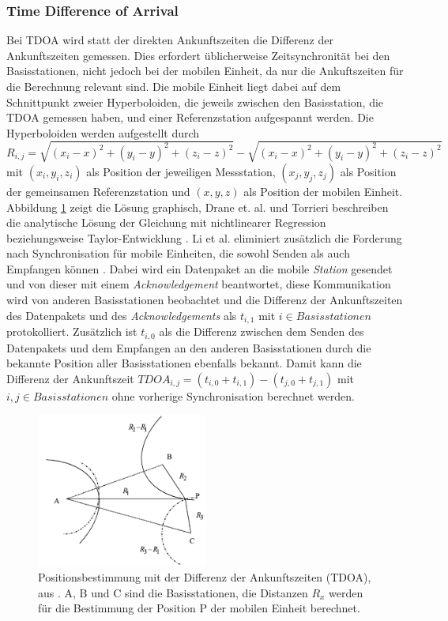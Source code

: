 \subsubsection{Time Difference of Arrival}
Bei TDOA wird statt der direkten Ankunftszeiten die Differenz der Ankunftszeiten gemessen. 
Dies erfordert üblicherweise Zeitsynchronität bei den Basisstationen, nicht jedoch bei der mobilen Einheit, da nur die Ankuftszeiten für die Berechnung relevant sind. 
Die mobile Einheit liegt dabei auf dem Schnittpunkt zweier Hyperboloiden, die jeweils zwischen den Basisstation, die TDOA gemessen haben, und einer Referenzstation aufgespannt werden. 
Die Hyperboloiden werden aufgestellt durch \\
$R_{i,j} = \sqrt{(x_i - x)^2 + (y_i - y)^2 + (z_i - z)^2} - \sqrt{(x_i - x)^2 + (y_i - y)^2 + (z_i - z)^2}$ mit $(x_i,y_i,z_i)$ als Position der jeweiligen Messstation, $(x_j,y_j,z_j)$ als Position der gemeinsamen Referenzstation und $(x,y,z)$ als Position der mobilen Einheit. 
Abbildung \ref{fig:tdoa} zeigt die Lösung graphisch, Drane et. al. und Torrieri beschreiben die analytische Lösung der Gleichung mit nichtlinearer Regression \cite{drane1998positioning} beziehungsweise Taylor-Entwicklung \cite{torrieri1984statistical}. 
Li et al. eliminiert zusätzlich die Forderung nach Synchronisation für mobile Einheiten, die sowohl Senden als auch Empfangen können \cite{li2000comparison}. 
Dabei wird ein Datenpaket an die mobile \emph{Station} gesendet und von dieser mit einem \emph{Acknowledgement} beantwortet, diese Kommunikation wird von anderen Basisstationen beobachtet und die Differenz der Ankunftszeiten des Datenpakets und des \emph{Acknowledgements} als $t_{i,1}$ mit $i \in Basisstationen$ protokolliert. 
Zusätzlich ist $t_{i,0}$ als die Differenz zwischen dem Senden des Datenpakets und dem Empfangen an den anderen Basisstationen durch die bekannte Position aller Basisstationen ebenfalls bekannt. 
Damit kann die Differenz der Ankunftszeit $TDOA_{i,j} = (t_{i,0} + t_{i,1}) - (t_{j,0} + t_{j,1})$ mit $i,j \in Basisstationen$ ohne vorherige Synchronisation berechnet werden. 

\begin{figure}[h]
  \centering
	\includegraphics[width=0.5\textwidth]{images/tdoa.png}
  \caption{Positionsbestimmung mit der Differenz der Ankunftszeiten (TDOA), aus \cite{liu2007survey}. A, B und C sind die Basisstationen, die Distanzen $R_x$ werden für die Bestimmung der Position P der mobilen Einheit berechnet.}
  \label{fig:tdoa}
\end{figure}

